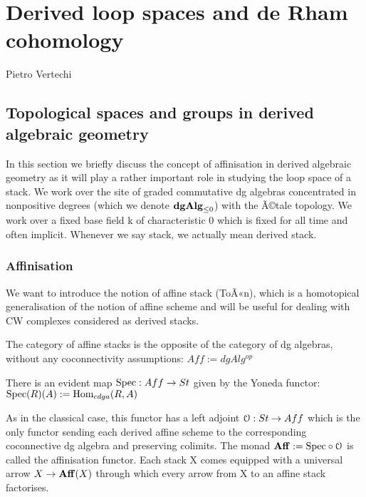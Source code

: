 \chapter{Derived loop spaces and de Rham cohomology}
\begin{flushright}
  Pietro Vertechi
\end{flushright}

\begin{refsection}

\section{Topological spaces and groups in derived algebraic geometry}
\label{topology}
In this section we briefly discuss the concept of affinisation in
derived algebraic geometry as it will play a rather important role in studying the loop space of a stack. We work over the site of graded commutative dg algebras
concentrated in nonpositive degrees (which we denote $\mathbf{dgAlg}_{\leq 0}$) with the Ã©tale topology. We work
over a fixed base field k of characteristic 0 which is fixed for all time and often implicit. Whenever we say stack, we actually mean derived stack.
\subsection{Affinisation}

We want to introduce the notion of affine stack (ToÃ«n), which is a homotopical generalisation of the notion of affine scheme and will be useful for dealing
with CW complexes considered as derived stacks.
\begin{definition}
The category of affine stacks is the opposite of the category of dg algebras, without any coconnectivity assumptions: $Aff:=dgAlg^{op}$
\end{definition}

\begin{remark}
There is an evident map $\mathrm{Spec}: Aff \to St $ given by the Yoneda functor: $\mathrm{Spec}(R)(A):=\mathrm{Hom}_{cdga}(R,A)$
\end{remark}

As in the classical case, this functor has a left adjoint $\mathcal{O}: St \to Aff$ which is the only functor sending each derived affine scheme to the corresponding coconnective
dg algebra and preserving colimits.
The monad $\mathbf{Aff}:= \mathrm{Spec}\circ\mathcal{O}$ is called the affinisation functor. Each stack X comes equipped with a universal arrow $X\to\mathbf{Aff}(X)$ through which every arrow
from X to an affine stack factorises.\\


\end{refsection}

